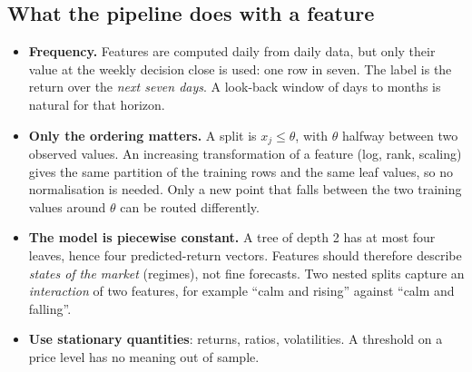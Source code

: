 \documentclass[11pt,a4paper]{article}
\newcommand{\1}{\mathbf{1}}
\begin{document}
\subsection{What the pipeline does with a feature}
\begin{itemize}
\item \textbf{Frequency.} Features are computed daily from daily data, but only their value at the weekly decision close is used: one row in seven. The label is the return over the \emph{next seven days}. A look-back window of days to months is natural for that horizon.
\item \textbf{Only the ordering matters.} A split is $x_j\le\theta$, with $\theta$ halfway between two observed values. An increasing transformation of a feature (log, rank, scaling) gives the same partition of the training rows and the same leaf values, so no normalisation is needed. Only a new point that falls between the two training values around $\theta$ can be routed differently.
\item \textbf{The model is piecewise constant.} A tree of depth 2 has at most four leaves, hence four predicted-return vectors. Features should therefore describe \emph{states of the market} (regimes), not fine forecasts. Two nested splits capture an \emph{interaction} of two features, for example ``calm and rising'' against ``calm and falling''.
\item \textbf{Use stationary quantities}: returns, ratios, volatilities. A threshold on a price level has no meaning out of sample.
\end{itemize}
\end{document}
